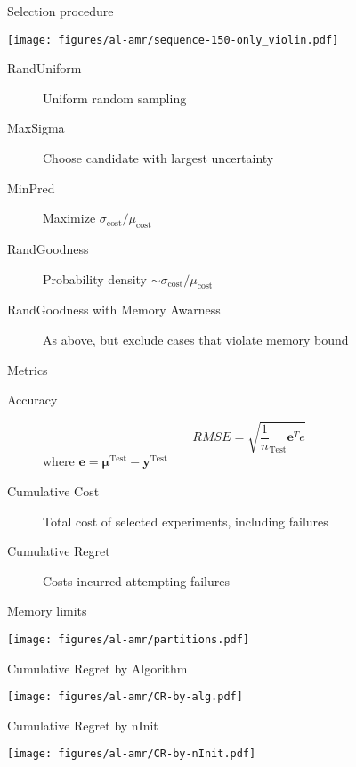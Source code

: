 \documentclass{beamer}
\begin{document}
\begin{frame}{Selection procedure}
  \begin{center}
    \texttt{[image: figures/al-amr/sequence-150-only\_violin.pdf]}
  \end{center}
  \begin{description}
  \item[RandUniform] Uniform random sampling
  \item[MaxSigma] Choose candidate with largest uncertainty
  \item[MinPred] Maximize $\sigma_{\text{cost}} / \mu_{\text{cost}}$
  \item[RandGoodness] Probability density $\sim \sigma_{\text{cost}} / \mu_{\text{cost}}$
  \item[RandGoodness with Memory Awarness] As above, but exclude cases that violate memory bound
  \end{description}
\end{frame}

\begin{frame}{Metrics}
  \begin{description}
  \item[Accuracy] $$ RMSE = \sqrt{\frac 1 n_{\text{Test}} \bm e^T e } $$
    where $\bm e = \bm{\mu}^{\text{Test}} - \bm{y}^{\text{Test}}$
  \item[Cumulative Cost] Total cost of selected experiments, including failures
  \item[Cumulative Regret] Costs incurred attempting failures
  \end{description}
\end{frame}

\begin{frame}{Memory limits}
  \begin{center}
    \texttt{[image: figures/al-amr/partitions.pdf]}
  \end{center}
\end{frame}

\begin{frame}{Cumulative Regret by Algorithm}
  \begin{center}
    \texttt{[image: figures/al-amr/CR-by-alg.pdf]}
  \end{center}
\end{frame}

\begin{frame}{Cumulative Regret by nInit}
  \begin{center}
    \texttt{[image: figures/al-amr/CR-by-nInit.pdf]}
  \end{center}
\end{frame}
\end{document}

